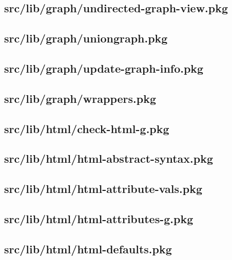 \subsection{src/lib/graph/undirected-graph-view.pkg}


\subsection{src/lib/graph/uniongraph.pkg}


\subsection{src/lib/graph/update-graph-info.pkg}


\subsection{src/lib/graph/wrappers.pkg}


\subsection{src/lib/html/check-html-g.pkg}


\subsection{src/lib/html/html-abstract-syntax.pkg}


\subsection{src/lib/html/html-attribute-vals.pkg}


\subsection{src/lib/html/html-attributes-g.pkg}


\subsection{src/lib/html/html-defaults.pkg}


